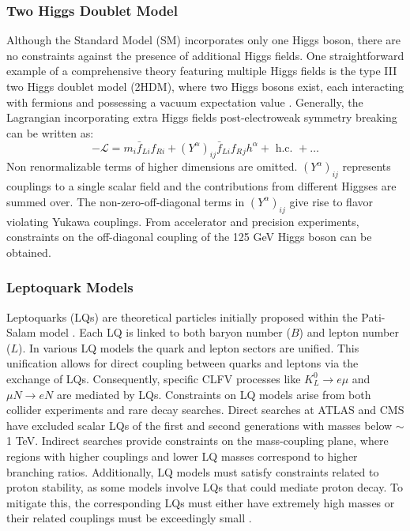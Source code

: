 \subsubsection{Two Higgs Doublet Model}\label{2higgs}
Although the Standard Model (SM) incorporates only one Higgs boson, there are no constraints against the presence of additional Higgs fields. One straightforward example of a comprehensive theory featuring multiple Higgs fields is the type III two Higgs doublet model (2HDM), where two Higgs bosons exist, each interacting with fermions and possessing a vacuum expectation value \cite{Harnik_2013}. Generally, the Lagrangian incorporating extra Higgs fields post-electroweak symmetry breaking can be written as:
\begin{equation}
-\mathscr{L}=m_i \bar{f}_{L i} f_{R i}+\left(Y^\alpha\right)_{i j} \bar{f}_{L i} f_R{ }_j h^\alpha+\text { h.c. }+\ldots
\end{equation}
Non renormalizable terms of higher dimensions are omitted. $(Y^\alpha)_{i j}$ represents couplings to a single scalar field and the contributions from different Higgses are summed over. The non-zero-off-diagonal terms in $(Y^\alpha)_{i j}$ give rise to flavor violating Yukawa couplings. From accelerator and precision experiments, constraints on the off-diagonal coupling of the 125 GeV Higgs boson can be obtained.
\subsubsection{Leptoquark Models}
Leptoquarks (LQs) are theoretical particles initially proposed within the Pati-Salam model \cite{PhysRevD.10.275}. Each LQ is linked to both baryon number ($B$) and lepton number ($L$). In various LQ models the quark and lepton sectors are unified. This unification allows for direct coupling between quarks and leptons via the exchange of LQs. Consequently, specific CLFV processes like $K_L^0 \rightarrow e \mu$ and $\mu N \rightarrow e N$ are mediated by LQs. Constraints on LQ models arise from both collider experiments and rare decay searches. Direct searches at ATLAS and CMS have excluded scalar LQs of the first and second generations with masses below $\sim$1 TeV. Indirect searches provide constraints on the mass-coupling plane, where regions with higher couplings and lower LQ masses correspond to higher branching ratios. Additionally, LQ models must satisfy constraints related to proton stability, as some models involve LQs that could mediate proton decay. To mitigate this, the corresponding LQs must either have extremely high masses or their related couplings must be exceedingly small \cite{DORSNER20161}.
